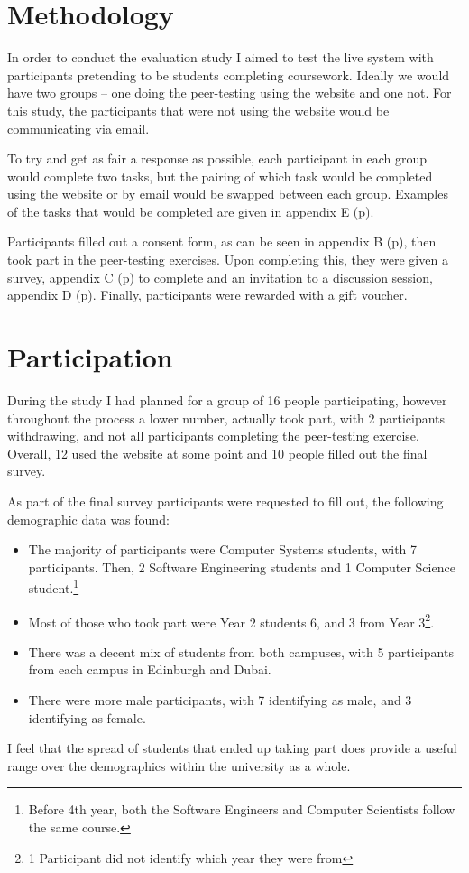 \documentclass[a4paper,11pt]{report}
\begin{document}
\section{Methodology}
In order to conduct the evaluation study I aimed to test the live system with participants pretending to be students completing coursework. Ideally we would have two groups -- one doing the peer-testing using the website and one not. For this study, the participants that were not using the website would be communicating via email.\par
To try and get as fair a response as possible, each participant in each group would complete two tasks, but the pairing of which task would be completed using the website or by email would be swapped between each group. Examples of the tasks that would be completed are given in appendix E (p\pageref{app:descriptors}).\par
Participants filled out a consent form, as can be seen in appendix B (p\pageref{app:consent}), then took part in the peer-testing exercises. Upon completing this, they were given a survey, appendix C (p\pageref{app:survey}) to complete and an invitation to a discussion session, appendix D (p\pageref{app:discussion}). Finally, participants were rewarded with a gift voucher.

\section{Participation}
During the study I had planned for a group of 16 people participating, however throughout the process a lower number, actually took part, with 2 participants withdrawing, and not all participants completing the peer-testing exercise. Overall, 12 used the website at some point and 10 people filled out the final survey.\par
As part of the final survey participants were requested to fill out, the following demographic data was found:
\begin{itemize}
\item The majority of participants were Computer Systems students, with 7 participants. Then, 2 Software Engineering students and 1 Computer Science student.\footnote{Before 4th year, both the Software Engineers and Computer Scientists follow the same course.}
\item Most of those who took part were Year 2 students 6, and 3 from Year 3\footnote{1 Participant did not identify which year they were from}. 
\item There was a decent mix of students from both campuses, with 5 participants from each campus in Edinburgh and Dubai.
\item There were more male participants, with 7 identifying as male, and 3 identifying as female.
\end{itemize}
I feel that the spread of students that ended up taking part does provide a useful range over the demographics within the university as a whole.
\end{document}
